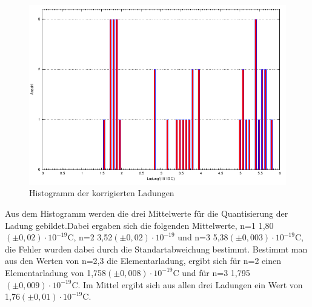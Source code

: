 \documentclass[12pt]{scrartcl}
\begin{document}
\begin{figure}[H] 
  \centering
    \includegraphics[scale = 1.3]{messung.pdf}
  	\caption[Histogramm der korrigierten Ladungen]{Histogramm der korrigierten Ladungen}
  \label{fig:histogramm}
\end{figure}

Aus dem Histogramm werden die drei Mittelwerte für die Quantisierung der Ladung gebildet.Dabei ergaben sich die folgenden Mittelwerte, n=1 \hspace*{4px} 1,80$(\pm0,02)\cdot 10^{-19}$C, n=2 \hspace*{4px} 3,52$(\pm 0,02)\cdot 10^{-19}$ und n=3 \hspace*{4px} 5,38$(\pm 0,003)\cdot 10^{-19}$C, die Fehler wurden dabei durch die Standartabweichung bestimmt. Bestimmt man aus den Werten von n=2,3 die Elementarladung, ergibt sich für n=2 einen Elementarladung von 1,758$(\pm 0,008)\cdot 10^{-19}$C und für n=3 \hspace*{4px} 1,795$(\pm 0,009)\cdot 10^{-19}$C.
Im Mittel ergibt sich aus allen drei Ladungen ein Wert von 1,76$(\pm 0,01)\cdot 10^{-19}$C.
\end{document}
